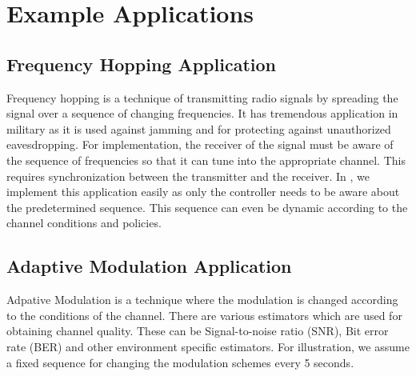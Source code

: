 \section{Example Applications}


\subsection{Frequency Hopping Application}
Frequency hopping is a technique of transmitting radio signals by spreading the signal over a sequence of changing frequencies. It has tremendous application in military as it is used against jamming and for protecting against unauthorized eavesdropping. For implementation, the receiver of the signal must be aware of the sequence of frequencies so that it can tune into the appropriate channel. This requires synchronization between the transmitter and the receiver. In \crossflow, we implement this application easily as only the controller needs to be aware about the predetermined sequence. This sequence can even be dynamic according to the channel conditions and policies.   

\subsection{Adaptive Modulation Application}
Adpative Modulation is a technique where the modulation is changed according to the conditions of the channel. There are various estimators which are used for obtaining channel quality. These can be Signal-to-noise ratio (SNR), Bit error rate (BER) and other environment specific estimators. For illustration, we assume a fixed sequence for changing the modulation schemes every 5 seconds. 
